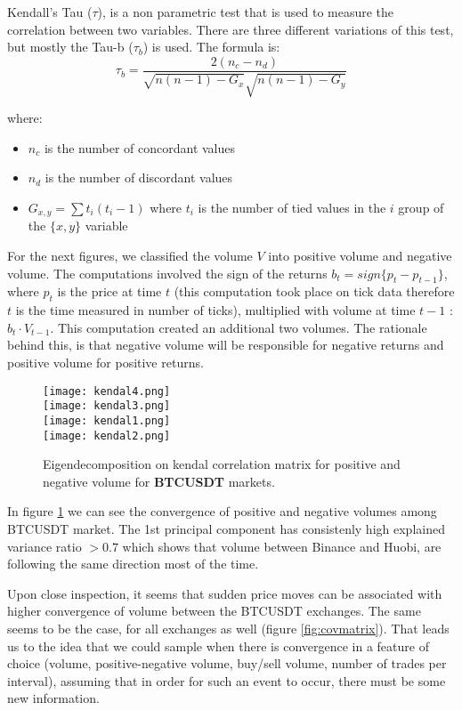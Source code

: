 Kendall's Tau (\(\tau\)), is a non parametric test that is used to measure the correlation between two variables. There are three different variations of this test, but mostly the Tau-b (\(\tau_b\)) is used. The formula is:
\[
\tau_b = \frac{2(n_c - n_d)}{\sqrt{n(n-1) - G_x}\sqrt{n(n-1) - G_y}} 
\]

where:
\begin{itemize}
\item \(n_c\) is the number of concordant values
\item \(n_d\) is the number of discordant values
\item \(G_{x,y} = \sum{t_i(t_i-1)}\) where \(t_i\) is the number of tied values in the \(i\) group of the \(\{x,y\}\) variable
\end{itemize}

For the next figures, we classified the volume \(V\) into positive volume and negative volume. The computations involved the sign of the returns \(b_t = sign\{p_t - p_{t-1}\}\), where \(p_t\) is the price at time \(t\) (this computation took place on tick data therefore \(t\) is the time measured in number of ticks), multiplied with volume at time \(t-1\) : \(b_t \cdot V_{t-1}\). This computation created an additional two volumes. The rationale behind this, is that negative volume will be responsible for negative returns and positive volume for positive returns. 

\begin{figure}[H]
	\centering
    \texttt{[image: kendal4.png]} \\
    \texttt{[image: kendal3.png]} \\ 
    \texttt{[image: kendal1.png]} \\
    \texttt{[image: kendal2.png]} \\
	\caption{Eigendecomposition on kendal correlation matrix for positive and negative volume for \textbf{BTCUSDT} markets.}
    \label{fig:pcakendall}
\end{figure}

In figure \ref{fig:pcakendall} we can see the convergence of positive and negative volumes among BTCUSDT market. The 1st principal component has consistenly high explained variance ratio \( > 0.7 \) which shows that volume between Binance and Huobi, are following the same direction most of the time.

Upon close inspection, it seems that sudden price moves can be associated with higher convergence of volume between the BTCUSDT exchanges. The same seems to be the case, for all exchanges as well (figure \ref{fig:covmatrix}). That leads us to the idea that we could sample when there is convergence in a feature of choice (volume, positive-negative volume, buy/sell volume, number of trades per interval), assuming that in order for such an event to occur, there must be some new information. 





